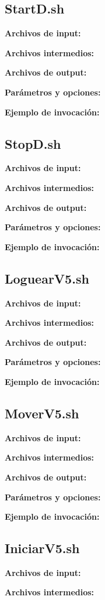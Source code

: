 \documentclass[a4paper,12pt]{article}
\begin{document}
\subsection{ StartD.sh }

{\bf Archivos de input:}

{\bf Archivos intermedios:}

{\bf Archivos de output:}

{\bf Parámetros y opciones:}

{\bf Ejemplo de invocación:}


\subsection{ StopD.sh }

{\bf Archivos de input:}

{\bf Archivos intermedios:}

{\bf Archivos de output:}

{\bf Parámetros y opciones:}

{\bf Ejemplo de invocación:}


\subsection{ LoguearV5.sh }

{\bf Archivos de input:}

{\bf Archivos intermedios:}

{\bf Archivos de output:}

{\bf Parámetros y opciones:}

{\bf Ejemplo de invocación:}


\subsection { MoverV5.sh }

{\bf Archivos de input:}

{\bf Archivos intermedios:}

{\bf Archivos de output:}

{\bf Parámetros y opciones:}

{\bf Ejemplo de invocación:}


\subsection{  IniciarV5.sh }

{\bf Archivos de input:}

{\bf Archivos intermedios:}
\end{document}
